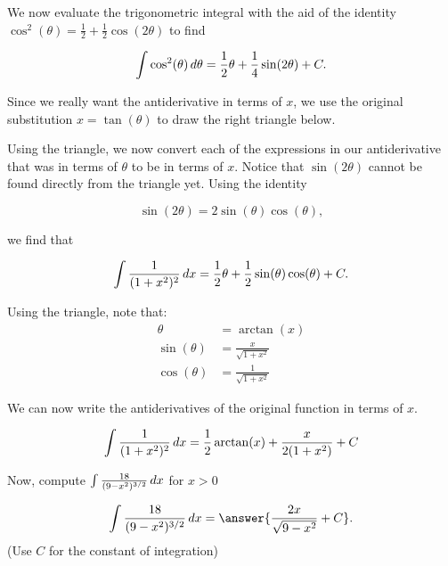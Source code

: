 \documentclass{ximera}
\begin{document}
\begin{exercise}
\begin{example}
We now evaluate the trigonometric integral with the aid of the identity $\cos^{2}(\theta)=\frac{1}{2}+\frac{1}{2}\cos(2\theta)$ to find

\[
\int \cos^2(\theta) \mathop{}\!d \theta =  \frac{1}{2}\theta + \frac{1}{4}\sin(2\theta) + C .
\]

Since we really want the antiderivative in terms of $x$, we use the original substitution $x=\tan(\theta)$ to draw the right triangle below.

    \begin{image}
    \end{image}

Using the triangle, we now convert each of the expressions in our antiderivative that was in terms of $\theta$ to be in terms of $x$.  Notice that $\sin(2 \theta)$ cannot be found directly from the triangle yet.  Using the identity

\[
\sin(2\theta)=2\sin(\theta)\cos(\theta),
\]

we find that 

\[ \int \frac{1}{ (1+x^2)^2} \mathop{}\!d x = \frac{1}{2}\theta + \frac{1}{2} \sin(\theta) \cos(\theta) + C.\]  

Using the triangle, note that: 
\begin{align}
\theta&=\arctan(x) \\
\sin(\theta)&=\frac{x}{\sqrt{1+x^2}} \\
 \cos(\theta)&=\frac{1}{\sqrt{1+x^2}} 
\end{align}

We can now write the antiderivatives of the original function in terms of $x$.

\[
\int \frac{1}{ (1+x^2)^2} \mathop{}\!d x=\frac{1}{2}\arctan(x) + \frac{x}{2(1+x^{2})} + C 
\]
\end{example}

Now, compute $\int \frac{18}{(9-x^2)^{3/2}} \mathop{}\!d x$ for $x>0$

\[
\int \frac{18}{(9-x^2)^{3/2}} \d x = \answer{\frac{2x}{\sqrt{9-x^2}}+C}.
\]
(Use $C$ for the constant of integration)
\end{exercise}
\end{document}
